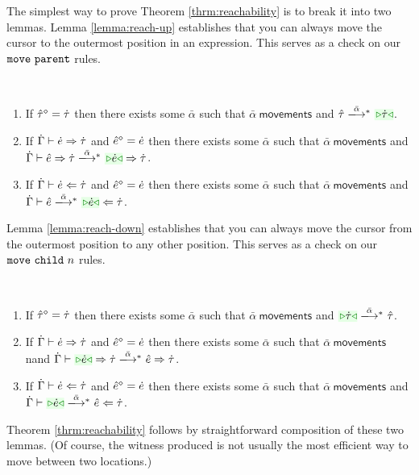 The simplest way to prove Theorem \ref{thrm:reachability} is to break it
into two lemmas. Lemma \ref{lemma:reach-up} establishes that you can always
move the cursor to the outermost position in an expression. This serves as
a check on our $\mathtt{move}~\mathtt{parent}$ rules.
\begin{lemma}[Reach Up]\label{lemma:reach-up} ~
  \begin{enumerate}[itemsep=0px,partopsep=0px,topsep=0px]
  \item If $\hat{\tau}^{\diamond}=\dot{\tau}$ then there exists some $\bar\alpha$
    such that $\bar\alpha~\mathsf{movements}$ and
    $\performTypI{\ztau}{\bar\alpha}{\zwsel{\htau}}$.

  \item If $\dot{\Gamma} \vdash \dot{e} \Rightarrow \dot{\tau}$ and $\hat{e}^{\diamond}=\dot{e}$
    then there exists some $\bar\alpha$ such that
    $\bar\alpha~\mathsf{movements}$ and
    $\performSynI{\hGamma}{\zexp}{\htau}{\bar\alpha}{\zwsel{\hexp}}{\htau}$.

  \item If $\dot{\Gamma} \vdash \dot{e} \Leftarrow \dot{\tau}$ and $\hat{e}^{\diamond}=\dot{e}$
    then there exists some $\bar\alpha$ such that
    $\bar\alpha~\mathsf{movements}$ and
    $\performAnaI{\hGamma}{\zexp}{\htau}{\bar\alpha}{\zwsel{\hexp}}$.
  \end{enumerate}
\end{lemma}
Lemma \ref{lemma:reach-down} establishes that you can always move the
cursor from the outermost position to any other position. This serves as a
check on our $\mathtt{move}~\mathtt{child}~{n}$ rules.
\begin{lemma}\label{lemma:reach-down} ~
  \begin{enumerate}[itemsep=0px,partopsep=0px,topsep=0px]
  \item If $\hat{\tau}^{\diamond}=\dot{\tau}$ then there exists some $\bar\alpha$
    such that $\bar\alpha~\mathsf{movements}$ and
    $\performTypI{\zwsel{\htau}}{\bar\alpha}{\ztau}$.

  \item If $\dot{\Gamma} \vdash \dot{e} \Rightarrow \dot{\tau}$ and $\hat{e}^{\diamond}=\dot{e}$
    then there exists some $\bar\alpha$ such that
    $\bar\alpha~\mathsf{movements}$ nand
    $\performSynI{\hGamma}{\zwsel{\hexp}}{\htau}{\bar\alpha}{\zexp}{\htau}$.

  \item If $\dot{\Gamma} \vdash \dot{e} \Leftarrow \dot{\tau}$ and $\hat{e}^{\diamond}=\dot{e}$
    then there exists some $\bar\alpha$ such that
    $\bar\alpha~\mathsf{movements}$ and
    $\performAnaI{\hGamma}{\zwsel{\hexp}}{\htau}{\bar\alpha}{\zexp}$.
  \end{enumerate}
\end{lemma}
Theorem \ref{thrm:reachability} follows by straightforward composition of
these two lemmas. (Of course, the witness produced is not usually the most efficient way
to move between two locations.)

